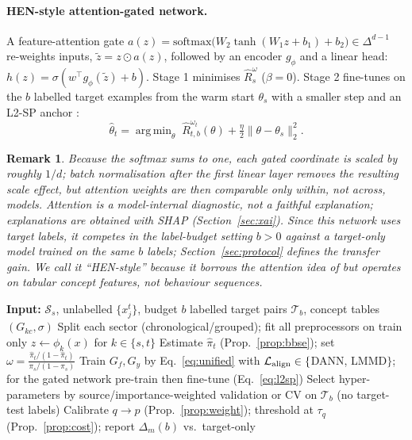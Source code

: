 \documentclass[journal]{IEEEtran}
\newtheorem{remark}{Remark}
\newcommand{\1}{\mathbf{1}}
\DeclareMathOperator*{\argmin}{arg\,min}
\begin{document}
\paragraph{HEN-style attention-gated network.} A feature-attention gate $a(z)=\mathrm{softmax}\big(W_2\tanh(W_1z+b_1)+b_2\big)\in\Delta^{d-1}$ re-weights inputs, $\tilde z=z\odot a(z)$, followed by an encoder $g_\phi$ and a linear head: $h(z)=\sigma(w^\top g_\phi(\tilde z)+b)$. Stage 1 minimises $\hat R_s^\omega$ ($\beta=0$). Stage 2 fine-tunes on the $b$ labelled target examples from the warm start $\theta_s$ with a smaller step and an L2-SP anchor \cite{li2018l2sp}:
\begin{equation}
\hat\theta_t=\argmin_{\theta}\;\hat R_{t,b}^{\omega_t}(\theta)+\tfrac{\eta}2\|\theta-\theta_s\|_2^2 .
\label{eq:l2sp}
\end{equation}
\begin{remark}
Because the softmax sums to one, each gated coordinate is scaled by roughly $1/d$; batch normalisation after the first linear layer removes the resulting scale effect, but attention weights are then comparable only within, not across, models. Attention is a model-internal diagnostic, not a faithful explanation; explanations are obtained with SHAP (Section~\ref{sec:xai}). Since this network uses target labels, it competes in the label-budget setting $b>0$ against a \emph{target-only} model trained on the same $b$ labels; Section~\ref{sec:protocol} defines the transfer gain. We call it ``HEN-style'' because it borrows the attention idea of \cite{zhu2020hen} but operates on tabular concept features, not behaviour sequences.
\end{remark}

\begin{algorithm}[t]
\caption{Cross-sector transfer (one directed pair $s\to t$)}\label{alg:pipeline}
\begin{algorithmic}[1]
\State \textbf{Input:} $\mathcal S_s$, unlabelled $\{x^t_j\}$, budget $b$ labelled target pairs $\mathcal T_b$, concept tables $(G_{kc},\sigma)$
\State Split each sector (chronological/grouped); fit all preprocessors on train only
\State $z\gets\phi_k(x)$ for $k\in\{s,t\}$ 
\State Estimate $\hat\pi_t$ (Prop.~\ref{prop:bbse}); set $\omega=\frac{\hat\pi_t/(1-\hat\pi_t)}{\pi_s/(1-\pi_s)}$
\State Train $G_f,G_y$ by Eq.~\eqref{eq:unified} with $\mathcal L_{\rm align}\in\{$DANN, LMMD$\}$; for the gated network pre-train then fine-tune (Eq.~\eqref{eq:l2sp})
\State Select hyper-parameters by source/importance-weighted validation or CV on $\mathcal T_b$ (no target-test labels)
\State Calibrate $q\!\to\!p$ (Prop.~\ref{prop:weight}); threshold at $\tau_q$ (Prop.~\ref{prop:cost}); report $\Delta_m(b)$ vs.\ target-only
\end{algorithmic}
\end{algorithm}
\end{document}
